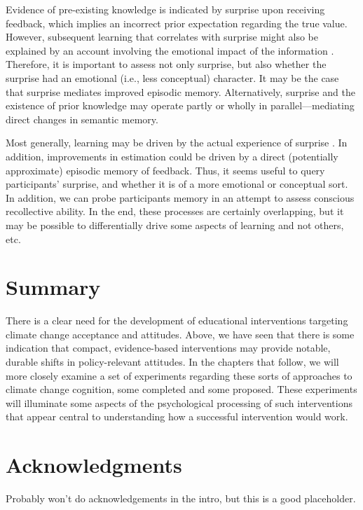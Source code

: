 Evidence of pre-existing knowledge is indicated by surprise upon receiving
feedback, which implies an incorrect prior expectation regarding the true value.
However, subsequent learning that correlates with surprise might also be
explained by an account involving the emotional impact of the information
\cite{munnich_surprise_2007,thagard_hot_2006}.  Therefore, it is important to
assess not only surprise, but also whether the surprise had an emotional (i.e.,
less conceptual) character. It may be the case that surprise mediates improved
episodic memory. Alternatively, surprise and the existence of prior knowledge
may operate partly or wholly in parallel---mediating direct changes in semantic
memory.

Most generally, learning may be driven by the actual experience of surprise
\cite[e.g.,][]{munnich_longevities_2005}.  In addition, improvements in estimation could be
driven by a direct (potentially approximate) episodic memory of feedback. Thus,
it seems useful to query participants' surprise, and whether it is of a more
emotional or conceptual sort. In addition, we can probe participants memory in
an attempt to assess conscious recollective ability. In the end, these processes
are certainly overlapping, but it may be possible to differentially drive some
aspects of learning and not others, etc.

\section{Summary}

There is a clear need for the development of educational interventions targeting
climate change acceptance and attitudes. Above, we have seen that there is some
indication that compact, evidence-based interventions may provide notable,
durable shifts in policy-relevant attitudes. In the chapters that follow, we
will more closely examine a set of experiments regarding these sorts of
approaches to climate change cognition, some completed and some proposed. These
experiments will illuminate some aspects of the psychological processing of such
interventions that appear central to understanding how a successful intervention
would work.

\section*{Acknowledgments}

Probably won't do acknowledgements in the intro, but this is a good placeholder.

